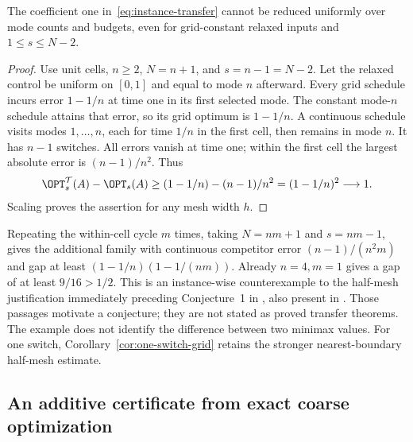 \begin{proposition}\label{prop:transfer-sharpness}
The coefficient one in~\eqref{eq:instance-transfer} cannot be reduced
uniformly over mode counts and budgets, even for grid-constant relaxed inputs
and $1\le s\le N-2$.
\end{proposition}
\begin{proof}
Use unit cells, $n\ge2$, $N=n+1$, and $s=n-1=N-2$. Let the relaxed
control be uniform on $[0,1]$ and equal to mode $n$ afterward. Every grid
schedule incurs error $1-1/n$ at time one in its first selected mode. The
constant mode-$n$ schedule attains that error, so its grid optimum is
$1-1/n$. A continuous schedule visits modes $1,\ldots,n$, each for time
$1/n$ in the first cell, then remains in mode $n$. It has $n-1$ switches.
All errors vanish at time one; within the first cell the largest absolute
error is $(n-1)/n^2$. Thus
\[
 \OPT_s^{\mathcal T}(A)-\OPT_s(A)
 \ge(1-1/n)-(n-1)/n^2=(1-1/n)^2\longrightarrow1.
\]
Scaling proves the assertion for any mesh width $h$.
\end{proof}

Repeating the within-cell cycle $m$ times, taking $N=nm+1$ and
$s=nm-1$, gives the additional family with continuous competitor error
$(n-1)/(n^2m)$ and gap at least $(1-1/n)(1-1/(nm))$.
Already $n=4,m=1$ gives a gap of at least $9/16>1/2$.
This is an instance-wise counterexample to the half-mesh justification
immediately preceding Conjecture~1 in
\citet[p.~615]{sager-zeile2021}, also present in
\citet[p.~139]{zeile2021thesis}. Those passages motivate a conjecture;
they are not stated as proved transfer theorems. The example does not
identify the difference between two minimax values. For one switch,
Corollary~\ref{cor:one-switch-grid} retains the stronger nearest-boundary
half-mesh estimate.

\subsection{An additive certificate from exact coarse optimization}


